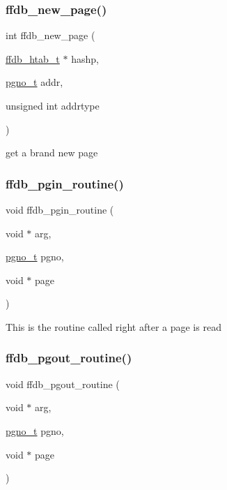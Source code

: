\subsubsection{\texorpdfstring{ffdb\_new\_page()}{ffdb\_new\_page()}}
{\footnotesize\ttfamily int ffdb\+\_\+new\+\_\+page (\begin{DoxyParamCaption}\item[{\mbox{\hyperlink{adat-devel_2other__libs_2filedb_2filehash_2ffdb__hash_8h_ae592010ed2bedc975d3cc0b7d074b9d1}{ffdb\+\_\+htab\+\_\+t}} $\ast$}]{hashp,  }\item[{\mbox{\hyperlink{adat-devel_2other__libs_2filedb_2filehash_2ffdb__db_8h_a000813331643d38481142bcce7de1501}{pgno\+\_\+t}}}]{addr,  }\item[{unsigned int}]{addrtype }\end{DoxyParamCaption})}

get a brand new page \mbox{\label{adat-devel_2other__libs_2filedb_2filehash_2ffdb__page_8c_a1af7c7a984e68481194b1457fc9e2165}} 
\subsubsection{\texorpdfstring{ffdb\_pgin\_routine()}{ffdb\_pgin\_routine()}}
{\footnotesize\ttfamily void ffdb\+\_\+pgin\+\_\+routine (\begin{DoxyParamCaption}\item[{void $\ast$}]{arg,  }\item[{\mbox{\hyperlink{adat-devel_2other__libs_2filedb_2filehash_2ffdb__db_8h_a000813331643d38481142bcce7de1501}{pgno\+\_\+t}}}]{pgno,  }\item[{void $\ast$}]{page }\end{DoxyParamCaption})}

This is the routine called right after a page is read \mbox{\label{adat-devel_2other__libs_2filedb_2filehash_2ffdb__page_8c_a29e873047c5bbb8214d85f3061c2b48c}} 
\subsubsection{\texorpdfstring{ffdb\_pgout\_routine()}{ffdb\_pgout\_routine()}}
{\footnotesize\ttfamily void ffdb\+\_\+pgout\+\_\+routine (\begin{DoxyParamCaption}\item[{void $\ast$}]{arg,  }\item[{\mbox{\hyperlink{adat-devel_2other__libs_2filedb_2filehash_2ffdb__db_8h_a000813331643d38481142bcce7de1501}{pgno\+\_\+t}}}]{pgno,  }\item[{void $\ast$}]{page }\end{DoxyParamCaption})}

